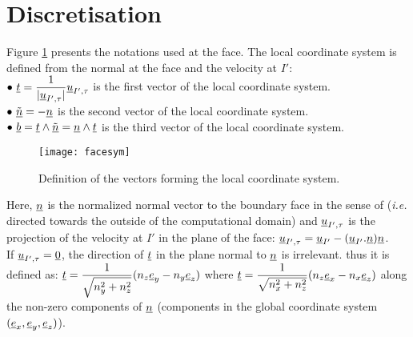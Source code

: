\section*{Discretisation}

Figure \ref{Base_Clsyvt_fig_facesym} presents the notations used at the face.
The local coordinate system is defined from the normal at the face and
the velocity at $I'$:\\
$\bullet\ \displaystyle\underline{t}
=\frac{1}{|\underline{u}_{I',\tau}|}\underline{u}_{I',\tau}$ is the first
vector of the local coordinate system.\\
$\bullet\ \underline{\tilde{n}}=-\underline{n}$ is the second
vector of the local coordinate system.\\
$\bullet\ \vect{b}=\vect{t}\wedge\vect{\tilde{n}}=\vect{n}\wedge\vect{t}$
is the third
vector of the local coordinate system.\\

\begin{figure}[h]
\centerline{\texttt{[image: facesym]}}
\caption{\label{Base_Clsyvt_fig_facesym}Definition of the vectors forming the local coordinate system.}
\end{figure}

Here, $\underline{n}$ is the normalized normal vector to the boundary face
in the sense of  \CS ({\em i.e.}
directed towards the outside of the computational domain)
and $\underline{u}_{I',\tau}$ is the projection of the velocity at $I'$
in the plane of the face:
$\underline{u}_{I',\tau}=\underline{u}_{I'}-(\underline{u}_{I'}.\underline{n})\underline{n}$.\\
If $\underline{u}_{I',\tau}=\underline{0}$, the direction of $\underline{t}$ in the plane
normal to $\underline{n}$ is irrelevant. thus it is defined as:
$\displaystyle\underline{t}=\frac{1}{\sqrt{n_y^2+n_z^2}}(n_z\underline{e}_y-n_y\underline{e}_z)$
where
$\displaystyle\underline{t}=\frac{1}{\sqrt{n_x^2+n_z^2}}(n_z\underline{e}_x-n_x\underline{e}_z)$
along the non-zero components of $\underline{n}$ (components in the global
coordinate system $(\underline{e}_x,\underline{e}_y,\underline{e}_z)$).


